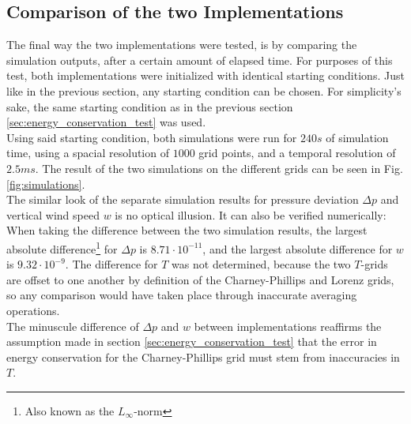 \subsection{Comparison of the two Implementations}
The final way the two implementations were tested, is by comparing the simulation outputs, after a certain amount of elapsed time.
For purposes of this test, both implementations were initialized with identical starting conditions.
Just like in the previous section, any starting condition can be chosen.
For simplicity's sake, the same starting condition as in the previous section \ref{sec:energy_conservation_test} was used.\\
Using said starting condition, both simulations were run for $240s$ of simulation time, using a spacial resolution of $1000$ grid points, and a temporal resolution of $2.5ms$.
The result of the two simulations on the different grids can be seen in Fig. \ref{fig:simulations}.\\
The similar look of the separate simulation results for pressure deviation $\Delta p$ and vertical wind speed $w$ is no optical illusion.
It can also be verified numerically:
When taking the difference between the two simulation results, the largest absolute difference\footnote{Also known as the $L_\infty$-norm} for $\Delta p$ is $8.71\cdot 10^{-11}$, and the largest absolute difference for $w$ is $9.32\cdot 10^{-9}$.
The difference for $T$ was not determined, because the two $T$-grids are offset to one another by definition of the Charney-Phillips and Lorenz grids, so any comparison would have taken place through inaccurate averaging operations.\\
The minuscule difference of $\Delta p$ and $w$ between implementations reaffirms the assumption made in section \ref{sec:energy_conservation_test} that the error in energy conservation for the Charney-Phillips grid must stem from inaccuracies in $T$.


